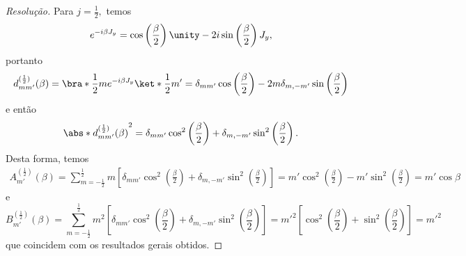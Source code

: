 \begin{proof}[Resolução]
   Para \(j = \frac12,\) temos
   \begin{equation*}
      e^{-i \beta J_y} = \cos\left(\frac{\beta}{2}\right)\unity -2i \sin\left(\frac{\beta}{2}\right) J_y,
   \end{equation*}
   portanto
   \begin{equation*}
      d^{(\frac12)}_{mm'}(\beta) = \bra*{\frac12m}e^{-i\beta J_y}\ket*{\frac12m'} = \delta_{mm'}\cos\left(\frac\beta2\right) - 2m\delta_{m,{-m'}}\sin\left(\frac{\beta}{2}\right)
   \end{equation*}
   e então
   \begin{equation*}
      \abs*{d^{(\frac12)}_{mm'}(\beta)}^2 = \delta_{mm'} \cos^2\left(\frac{\beta}{2}\right) + \delta_{m,-m'} \sin^2\left(\frac{\beta}{2}\right).
   \end{equation*}
   Desta forma, temos
   \begin{align*}
      A^{(\frac12)}_{m'}(\beta) = \sum_{m = -\frac12}^{\frac12} m\left[\delta_{mm'}\cos^2\left(\frac\beta2\right) + \delta_{m,-m'} \sin^2\left(\frac{\beta}{2}\right)\right]
                                = m' \cos^2\left(\frac\beta2\right) - m' \sin^2\left(\frac\beta2\right)
                                = m' \cos\beta
   \end{align*}
   e
   \begin{equation*}
      B^{(\frac12)}_{m'}(\beta) = \sum_{m = -\frac12}^{\frac12} m^2\left[\delta_{mm'}\cos^2\left(\frac\beta2\right) + \delta_{m,-m'} \sin^2\left(\frac{\beta}{2}\right)\right]
      = m'^2 \left[\cos^2\left(\frac\beta2\right) + \sin^2\left(\frac\beta2\right)\right]
                                = m'^2
   \end{equation*}
   que coincidem com os resultados gerais obtidos.
\end{proof}
